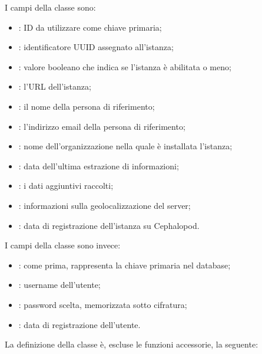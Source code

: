             I campi della classe  sono:
            
            \begin{itemize}
                \item {}: ID da utilizzare come chiave primaria;
                \item {}: identificatore \ac{UUID} assegnato all'istanza;
                \item {}: valore booleano che indica se l'istanza è abilitata o meno;
                \item {}: l'\ac{URL} dell'istanza;
                \item {}: il nome della persona di riferimento;
                \item {}: l'indirizzo email della persona di riferimento;
                \item {}: nome dell'organizzazione nella quale è installata l'istanza;
                \item {}: data dell'ultima estrazione di informazioni;
                \item {}: i dati aggiuntivi raccolti;
                \item {}: informazioni sulla geolocalizzazione del server;
                \item {}: data di registrazione dell'istanza su Cephalopod.
            \end{itemize}
            
            I campi della classe  sono invece:
            
            \begin{itemize}
                \item {}: come prima, rappresenta la chiave primaria nel database;
                \item {}: username dell'utente;
                \item {}: password scelta, memorizzata sotto cifratura;
                \item {}: data di registrazione dell'utente.
            \end{itemize}
            
            La definizione della classe  è, escluse le funzioni accessorie, la seguente:
            
